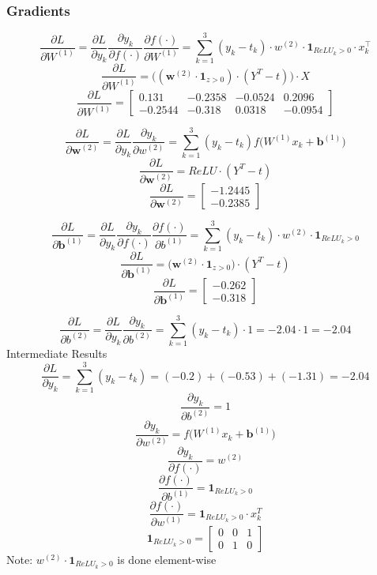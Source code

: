 \documentclass[a4paper,12pt]{article}
\begin{document}
\newpage

\subsubsection{Gradients}

$$
\frac{\partial L}{\partial W^{(1)}} = \frac{\partial L}{\partial y_k} \frac{\partial y_k}{\partial f(\cdot)} \frac{\partial f(\cdot)}{\partial W^{(1)}} = \sum_{k=1}^3 (y_k - t_k) \cdot w^{(2)} \cdot \mathbf{1}_{ReLU_k > 0} \cdot x_k^\top
$$
$$
\frac{\partial L}{\partial W^{(1)}} = \big( (\mathbf{w}^{(2)} \cdot \mathbf{1}_{z > 0}) \cdot (Y^T - t) \big) \cdot X
$$
$$
\frac{\partial L}{\partial W^{(1)}} =
\begin{bmatrix}
0.131 & -0.2358& -0.0524 & 0.2096 \\
-0.2544 & -0.318 & 0.0318 & -0.0954
\end{bmatrix}
$$

\vspace{1cm}

$$
\frac{\partial L}{\partial \mathbf{w}^{(2)}} = \frac{\partial L}{\partial y_k} \frac{\partial y_k}{\partial w^{(2)}} =  \sum_{k=1}^3(y_k-t_k) f\big( W^{(1)} x_k + \mathbf{b}^{(1)}\big)
$$
$$
\frac{\partial L}{\partial \mathbf{w}^{(2)}} =
ReLU \cdot (Y^T - t)
$$
$$
\frac{\partial L}{\partial \mathbf{w}^{(2)}} = \begin{bmatrix}
-1.2445 \\
-0.2385
\end{bmatrix}
$$

\vspace{1cm}

$$
\frac{\partial L}{\partial \mathbf{b}^{(1)}} = \frac{\partial L}{\partial y_k} \frac{\partial y_k}{\partial f(\cdot)} \frac{\partial f(\cdot)}{\partial b^{(1)}} = \sum_{k=1}^3 (y_k - t_k) \cdot w^{(2)} \cdot \mathbf{1}_{ReLU_k > 0}
$$
$$
\frac{\partial L}{\partial \mathbf{b}^{(1)}} = \big( \mathbf{w}^{(2)} \cdot \mathbf{1}_{z > 0} \big) \cdot (Y^T - t)
$$
$$
\frac{\partial L}{\partial \mathbf{b}^{(1)}} = \begin{bmatrix}
-0.262 \\
-0.318
\end{bmatrix}
$$

\vspace{1cm}

$$
\frac{\partial L}{\partial b^{(2)}} = \frac{\partial L}{\partial y_k} \frac{\partial y_k}{\partial b^{(2)}} =  \sum_{k=1}^3(y_k-t_k) \cdot 1= -2.04 \cdot 1 = -2.04
$$
Intermediate Results
$$
\frac{\partial L}{\partial y_k} = \sum_{k=1}^3(y_k-t_k) = (-0.2) + (-0.53) + (-1.31) = -2.04
$$
$$
\frac{\partial y_k}{\partial b^{(2)}} = 1
$$
$$
\frac{\partial y_k}{\partial w^{(2)}} = f\big( W^{(1)} x_k + \mathbf{b}^{(1)}\big)
$$
$$
\frac{\partial y_k}{\partial f(\cdot)} = w^{(2)}
$$
$$
\frac{\partial f(\cdot)}{\partial b^{(1)}} = \mathbf{1}_{ReLU_k > 0}
$$
$$
\frac{\partial f(\cdot)}{\partial w^{(1)}} = \mathbf{1}_{ReLU_k > 0} \cdot x_k^T
$$
$$
\mathbf{1}_{ReLU_k > 0} = \begin{bmatrix}
0 & 0 & 1 \\
0 & 1 & 0
\end{bmatrix}
$$
Note:
$
w^{(2)} \cdot \mathbf{1}_{ReLU_k > 0}
$ is done element-wise
\end{document}
